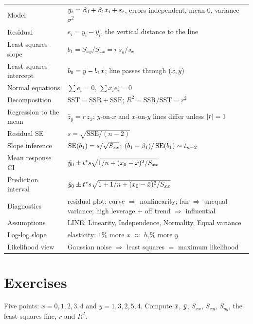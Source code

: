 \begin{center}
\renewcommand{\arraystretch}{1.25}
\begin{tabular}{p{4.1cm}p{8.4cm}}
\toprule
Model & $y_i = \beta_0+\beta_1x_i+\varepsilon_i$, errors independent, mean $0$, variance $\sigma^2$ \\
Residual & $e_i = y_i-\hat y_i$, the vertical distance to the line \\
Least squares slope & $b_1 = S_{xy}/S_{xx} = r\,s_y/s_x$ \\
Least squares intercept & $b_0 = \bar{y} - b_1\bar{x}$; line passes through $(\bar{x},\bar{y})$ \\
Normal equations & $\sum e_i = 0$, $\sum x_ie_i = 0$ \\
Decomposition & $\mathrm{SST} = \mathrm{SSR}+\mathrm{SSE}$; $R^2 = \mathrm{SSR}/\mathrm{SST} = r^2$ \\
Regression to the mean & $\hat z_y = r\,z_x$; $y$-on-$x$ and $x$-on-$y$ lines differ unless $\lvert r\rvert=1$ \\
Residual SE & $s = \sqrt{\mathrm{SSE}/(n-2)}$ \\
Slope inference & $\operatorname{SE}(b_1)=s/\sqrt{S_{xx}}$; $(b_1-\beta_1)/\operatorname{SE}(b_1)\sim t_{n-2}$ \\
Mean response CI & $\hat y_0\pm t^*s\sqrt{1/n+(x_0-\bar{x})^2/S_{xx}}$ \\
Prediction interval & $\hat y_0\pm t^*s\sqrt{1+1/n+(x_0-\bar{x})^2/S_{xx}}$ \\
Diagnostics & residual plot: curve $\Rightarrow$ nonlinearity; fan $\Rightarrow$ unequal variance; high leverage $+$ off trend $\Rightarrow$ influential \\
Assumptions & LINE: Linearity, Independence, Normality, Equal variance \\
Log-log slope & elasticity: $1\%$ more $x$ $\approx$ $b_1\%$ more $y$ \\
Likelihood view & Gaussian noise $\Rightarrow$ least squares $=$ maximum likelihood \\
\bottomrule
\end{tabular}
\end{center}

\section{Exercises}
\label{sec:slr-exercises}

\begin{exercise}
Five points: $x = 0,1,2,3,4$ and $y = 1,3,2,5,4$. Compute $\bar{x}$, $\bar{y}$,
$S_{xx}$, $S_{xy}$, $S_{yy}$, the least squares line, $r$ and $R^2$.
\end{exercise}

